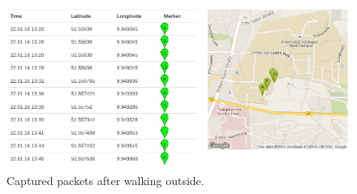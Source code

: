 \documentclass[a4paper]{article}
\begin{document}
\begin{figure}[h!]
\begin{center}
\includegraphics[scale=0.35]{pics/concl.png}
\caption{Captured packets after walking outside.}
\label{fig:concl}
\end{center}
\end{figure}
\end{document}
